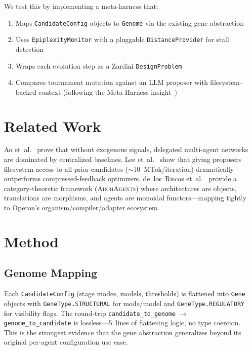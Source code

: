 \documentclass[11pt]{article}
\begin{document}
We test this by implementing a meta-harness that:
\begin{enumerate}
\item Maps \texttt{CandidateConfig} objects to \texttt{Genome} via the
    existing gene abstraction
\item Uses \texttt{EpiplexityMonitor} with a pluggable
    \texttt{DistanceProvider} for stall detection
\item Wraps each evolution step as a Zardini \texttt{DesignProblem}
\item Compares tournament mutation against an LLM proposer with
    filesystem-backed context (following the Meta-Harness
    insight~\cite{lee2026metaharness})
\end{enumerate}

\section{Related Work}

Ao et~al.~\cite{ao2026delegation} prove that without exogenous signals,
delegated multi-agent networks are dominated by centralized baselines.
Lee et~al.~\cite{lee2026metaharness} show that giving proposers
filesystem access to all prior candidates (${\sim}10$~MTok/iteration)
dramatically outperforms compressed-feedback optimizers. de~los~Riscos
et~al.~\cite{delosriscos2026categorical} provide a category-theoretic
framework (\textsc{ArchAgents}) where architectures are objects,
translations are morphisms, and agents are monoidal functors---mapping
tightly to Operon's organism/compiler/adapter ecosystem.

\section{Method}

\subsection{Genome Mapping}

Each \texttt{CandidateConfig} (stage modes, models, thresholds) is
flattened into \texttt{Gene} objects with \texttt{GeneType.STRUCTURAL}
for mode/model and \texttt{GeneType.REGULATORY} for visibility flags.
The round-trip \texttt{candidate\_to\_genome} $\rightarrow$
\texttt{genome\_to\_candidate} is lossless---5~lines of flattening
logic, no type coercion. This is the strongest evidence that the gene
abstraction generalizes beyond its original per-agent configuration
use case.
\end{document}
